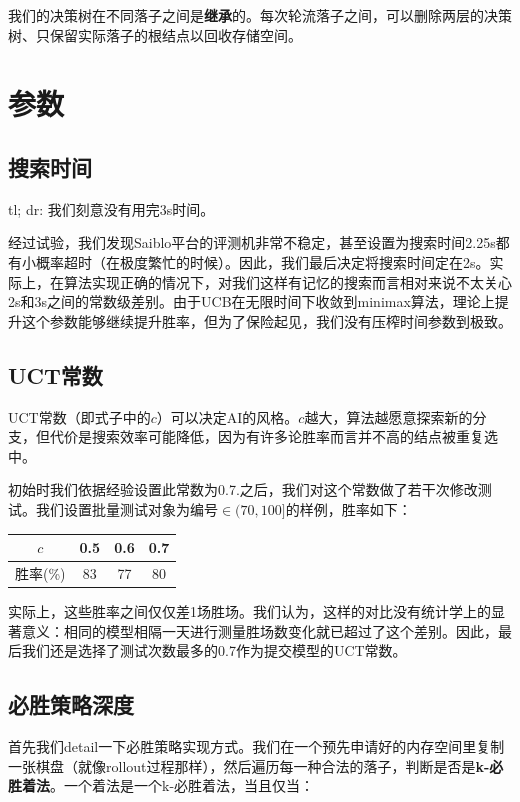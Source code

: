 \documentclass{article}
\begin{document}
	我们的决策树在不同落子之间是\textbf{继承}的。每次轮流落子之间，可以删除两层的决策树、只保留实际落子的根结点以回收存储空间。
	
	\section{参数}
	
	\subsection{搜索时间}
	
	tl; dr: 我们刻意没有用完3s时间。
	
	经过试验，我们发现Saiblo平台的评测机非常不稳定，甚至设置为搜索时间2.25s都有小概率超时（在极度繁忙的时候）。因此，我们最后决定将搜索时间定在2s。实际上，在算法实现正确的情况下，对我们这样有记忆的搜索而言相对来说不太关心2s和3s之间的常数级差别。由于UCB在无限时间下收敛到minimax算法，理论上提升这个参数能够继续提升胜率，但为了保险起见，我们没有压榨时间参数到极致。
	
	\subsection{UCT常数}
	
	UCT常数（即式子中的$c$）可以决定AI的风格。$c$越大，算法越愿意探索新的分支，但代价是搜索效率可能降低，因为有许多论胜率而言并不高的结点被重复选中。
	
	初始时我们依据经验设置此常数为0.7.之后，我们对这个常数做了若干次修改测试。我们设置批量测试对象为编号$\in (70, 100]$的样例，胜率如下：
	
	\begin{table}[h]
		\centering
		\begin{tabular}{||c|c|c|c||}
			\hline $c$&0.5&0.6&0.7 \\
			\hline 胜率(\%)&83&77&80\\
			\hline
		\end{tabular}
	\end{table}

	实际上，这些胜率之间仅仅差1场胜场。我们认为，这样的对比没有统计学上的显著意义：相同的模型相隔一天进行测量胜场数变化就已超过了这个差别。因此，最后我们还是选择了测试次数最多的0.7作为提交模型的UCT常数。
	
	\subsection{必胜策略深度}
	
	首先我们detail一下必胜策略实现方式。我们在一个预先申请好的内存空间里复制一张棋盘（就像rollout过程那样），然后遍历每一种合法的落子，判断是否是\textbf{k-必胜着法}。一个着法是一个k-必胜着法，当且仅当：
	
\end{document}
